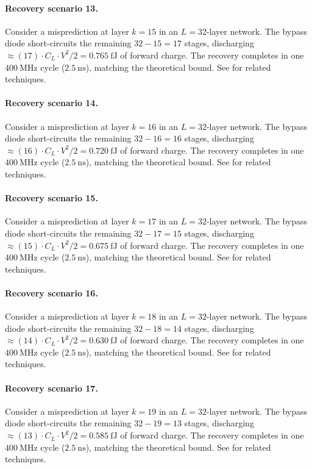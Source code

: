 \paragraph{Recovery scenario 13.}
Consider a misprediction at layer $k = 15$ in an $L = 32$-layer network.
The bypass diode short-circuits the remaining $32 - 15 = 17$ stages,
discharging $\approx (17) \cdot C_L \cdot V^2 / 2 = 0.765~\text{fJ}$
of forward charge. The recovery completes in one $400~\text{MHz}$ cycle ($2.5~\text{ns}$),
matching the theoretical bound. See \cite{dabre2022survey} for related techniques.

\paragraph{Recovery scenario 14.}
Consider a misprediction at layer $k = 16$ in an $L = 32$-layer network.
The bypass diode short-circuits the remaining $32 - 16 = 16$ stages,
discharging $\approx (16) \cdot C_L \cdot V^2 / 2 = 0.720~\text{fJ}$
of forward charge. The recovery completes in one $400~\text{MHz}$ cycle ($2.5~\text{ns}$),
matching the theoretical bound. See \cite{dabre2022survey} for related techniques.

\paragraph{Recovery scenario 15.}
Consider a misprediction at layer $k = 17$ in an $L = 32$-layer network.
The bypass diode short-circuits the remaining $32 - 17 = 15$ stages,
discharging $\approx (15) \cdot C_L \cdot V^2 / 2 = 0.675~\text{fJ}$
of forward charge. The recovery completes in one $400~\text{MHz}$ cycle ($2.5~\text{ns}$),
matching the theoretical bound. See \cite{dabre2022survey} for related techniques.

\paragraph{Recovery scenario 16.}
Consider a misprediction at layer $k = 18$ in an $L = 32$-layer network.
The bypass diode short-circuits the remaining $32 - 18 = 14$ stages,
discharging $\approx (14) \cdot C_L \cdot V^2 / 2 = 0.630~\text{fJ}$
of forward charge. The recovery completes in one $400~\text{MHz}$ cycle ($2.5~\text{ns}$),
matching the theoretical bound. See \cite{dabre2022survey} for related techniques.

\paragraph{Recovery scenario 17.}
Consider a misprediction at layer $k = 19$ in an $L = 32$-layer network.
The bypass diode short-circuits the remaining $32 - 19 = 13$ stages,
discharging $\approx (13) \cdot C_L \cdot V^2 / 2 = 0.585~\text{fJ}$
of forward charge. The recovery completes in one $400~\text{MHz}$ cycle ($2.5~\text{ns}$),
matching the theoretical bound. See \cite{dabre2022survey} for related techniques.

